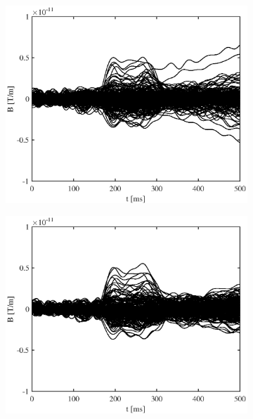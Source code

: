 \documentclass[doc,a4paper,12pt]{apa6}
\begin{document}
\begin{figure}
\begin{subfigure}[c]{0.36\textwidth}
    \label{img:butterfly:grad:sss:pa07}
  \end{subfigure}\vspace*{0.02\textwidth}
  \begin{subfigure}[c]{0.36\textwidth}
    \includegraphics[width=\textwidth]{ergebnisse/butterfly/pa10a1_eve2_raw_grad_butterfly.eps}
    \label{img:butterfly:grad:raw:pa10}
  \end{subfigure}\hspace*{0.08\textwidth}
  \begin{subfigure}[c]{0.36\textwidth}
    \includegraphics[width=\textwidth]{ergebnisse/butterfly/pa10a1_eve2_sss_grad_butterfly.eps}

\end{subfigure}
\end{figure}
\end{document}
